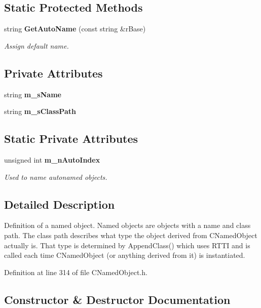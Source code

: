 \subsection*{Static Protected Methods}
\begin{CompactItemize}
\item 
string {\bf Get\-Auto\-Name} (const string \&r\-Base)
\begin{CompactList}\small\item\em Assign default name.\item\end{CompactList}\end{CompactItemize}
\subsection*{Private Attributes}
\begin{CompactItemize}
\item 
string {\bf m\_\-s\-Name}
\item 
string {\bf m\_\-s\-Class\-Path}
\end{CompactItemize}
\subsection*{Static Private Attributes}
\begin{CompactItemize}
\item 
unsigned int {\bf m\_\-n\-Auto\-Index}
\begin{CompactList}\small\item\em Used to name autonamed objects.\item\end{CompactList}\end{CompactItemize}


\subsection{Detailed Description}
Definition of a named object. Named objects are objects with a name and class path. The class path describes what type the object derived from CNamed\-Object actually is. That type is determined by Append\-Class() which uses RTTI and is called each time CNamed\-Object (or anything derived from it) is instantiated. 



Definition at line 314 of file CNamed\-Object.h.

\subsection{Constructor \& Destructor Documentation}
